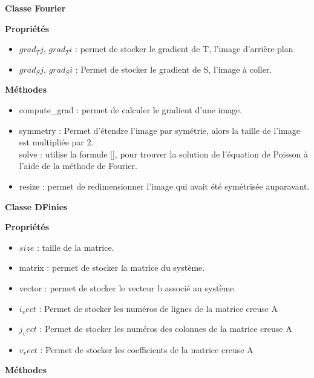 \begin{center}
\textbf{Classe Fourier}\\
\end{center}
\textbf{Propriétés}\\
\begin{itemize}
\item $grad_Tj$, $grad_Ti$ : permet de stocker le gradient de T, l'image d'arrière-plan\\
\item $grad_Sj$, $grad_Si$  : Permet de stocker le gradient de S, l'image à coller. \\
\end{itemize}
\textbf{Méthodes}
\begin{itemize}
\item compute\_grad : permet de calculer le gradient d'une image.
\item symmetry : Permet d'étendre l'image par symétrie, alors la taille de l'image est multipliée par 2. \\ 
solve : utilise la formule [], pour trouver la solution de l'équation de Poisson à l'aide de la méthode de Fourier. 
\item resize : permet de redimensionner l'image qui avait été symétrisée auparavant.
\end{itemize}
\begin{center}
\textbf{Classe DFinies}\\
\end{center}
\textbf{Propriétés}\\
\begin{itemize}
\item $size$ : taille de la matrice.
\item matrix : permet de stocker la matrice du système.
\item vector : permet de stocker le vecteur b associé au système.
\item $i_vect$ : Permet de stocker les numéros de lignes de la matrice creuse A
\item $j_vect$ : Permet de stocker les numéros des colonnes de la matrice creuse A
\item $v_vect$ : Permet de stocker les coefficients de la matrice creuse A
\end{itemize}
\textbf{Méthodes}
